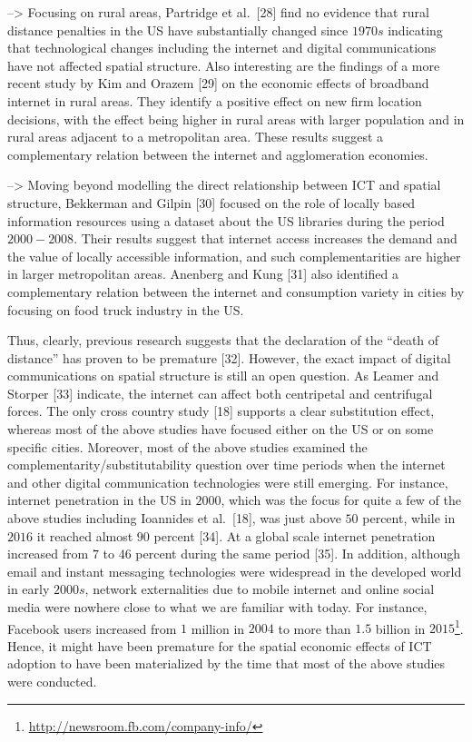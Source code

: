 \documentclass[10pt,letterpaper]{article}
\begin{document}
--\textgreater{} Focusing on rural areas, Partridge et al.~{[}28{]} find
no evidence that rural distance penalties in the US have substantially
changed since \(1970s\) indicating that technological changes including
the internet and digital communications have not affected spatial
structure. Also interesting are the findings of a more recent study by
Kim and Orazem {[}29{]} on the economic effects of broadband internet in
rural areas. They identify a positive effect on new firm location
decisions, with the effect being higher in rural areas with larger
population and in rural areas adjacent to a metropolitan area. These
results suggest a complementary relation between the internet and
agglomeration economies.

--\textgreater{} Moving beyond modelling the direct relationship between
ICT and spatial structure, Bekkerman and Gilpin {[}30{]} focused on the
role of locally based information resources using a dataset about the US
libraries during the period \(2000-2008\). Their results suggest that
internet access increases the demand and the value of locally accessible
information, and such complementarities are higher in larger
metropolitan areas. Anenberg and Kung {[}31{]} also identified a
complementary relation between the internet and consumption variety in
cities by focusing on food truck industry in the US.

\color{black}

Thus, clearly, previous research suggests that the declaration of the
``death of distance'' has proven to be premature {[}32{]}. However, the
exact impact of digital communications on spatial structure is still an
open question. As Leamer and Storper {[}33{]} indicate, the internet can
affect both centripetal and centrifugal forces. The only cross country
study {[}18{]} supports a clear substitution effect, whereas most of the
above studies have focused either on the US or on some specific cities.
Moreover, most of the above studies examined the
complementarity/substitutability question over time periods when the
internet and other digital communication technologies were still
emerging. For instance, internet penetration in the US in \(2000\),
which was the focus for quite a few of the above studies including
Ioannides et al.~{[}18{]}, was just above \(50\) percent, while in
\(2016\) it reached almost \(90\) percent {[}34{]}. At a global scale
internet penetration increased from \(7\) to \(46\) percent during the
same period {[}35{]}. In addition, although email and instant messaging
technologies were widespread in the developed world in early \(2000s\),
network externalities due to mobile internet and online social media
were nowhere close to what we are familiar with today. For instance,
Facebook users increased from \(1\) million in \(2004\) to more than
\(1.5\) billion in \(2015\)\footnote{\url{http://newsroom.fb.com/company-info/}}.
Hence, it might have been premature for the spatial economic effects of
ICT adoption to have been materialized by the time that most of the
above studies were conducted.
\end{document}
